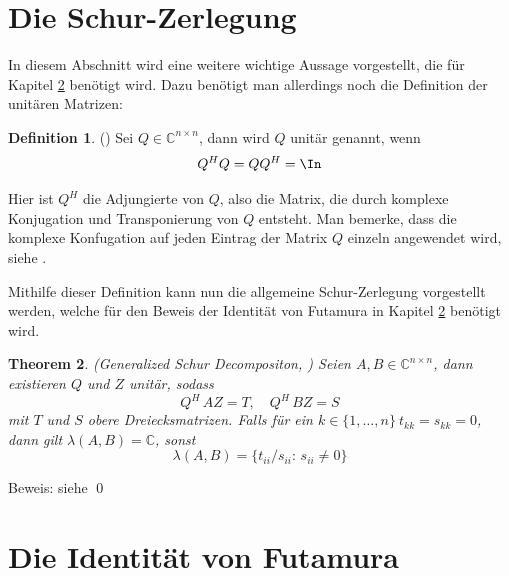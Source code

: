 \documentclass[a4paper,12pt]{report}
\newcommand{\C}{\mathbb C}
\newcommand{\1}{\mathds{1}}
\theoremstyle{plain} %
\newtheorem{theorem}{Theorem}
\theoremstyle{definition} %
\newtheorem{definition}[theorem]{Definition}
\theoremstyle{remark}
\begin{document}
      \section{Die Schur-Zerlegung}
            In diesem Abschnitt wird eine weitere wichtige Aussage vorgestellt, die für Kapitel \ref{sec: Futamura} benötigt wird.
            Dazu benötigt man allerdings noch die Definition der unitären Matrizen:
            \begin{definition}(\cite[S. 73]{matrixGolub})
                  Sei $Q \in\C^{n\times n}$, dann wird $Q$ unitär genannt, wenn
                  $$Q^HQ = QQ^H=\In$$
            \end{definition}

            Hier ist $Q^H$ die Adjungierte von $Q$, also die Matrix, die durch komplexe Konjugation und Transponierung von $Q$ entsteht.
            Man bemerke, dass die komplexe Konfugation auf jeden Eintrag der Matrix $Q$ einzeln angewendet wird, siehe \cite[S. 14]{matrixGolub}.

            Mithilfe dieser Definition kann nun die allgemeine Schur-Zerlegung vorgestellt werden, welche für den Beweis der Identität von Futamura in Kapitel \ref{sec: Futamura} benötigt wird.
            \begin{theorem}(Generalized Schur Decompositon, \cite[S. 377]{matrixGolub})
                  \label{thrm: allg Schur Zerlegung}
                  Seien $A, B \in \C^{n\times n}$, dann existieren $Q$ und $Z$ unitär, sodass
                  \begin{equation}
                        \label{eqn: allg Schur_Resultat}
                        Q^H\,AZ = T,\quad Q^H\, BZ = S
                  \end{equation}
                  mit $T$ und $S$ obere Dreiecksmatrizen.
                  Falls für ein $k\in \{1,\dots, n\}\ t_{kk}=s_{kk}=0$, dann gilt $\lambda(A, B) = \C$, sonst
                  \begin{equation}
                        \label{eqn: EW Pencil nach Schur}
                        \lambda(A, B) = \{t_{ii}/s_{ii}:\, s_{ii}\ne 0\}
                  \end{equation}
            \end{theorem}
            Beweis: siehe \cite[S. 377]{matrixGolub}\qed
      
      \section{Die Identität von Futamura}
      \label{sec: Futamura}
\end{document}
